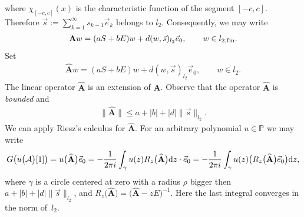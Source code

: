 \documentclass[pdftex]{sigma}
\numberwithin{equation}{section}
\begin{document}
where $\chi_{[-c,c]}(x)$ is the characteristic function of the segment $[-c,c]$. Therefore $\vec s := \sum\limits_{k=1}^\infty s_{k-1} \vec e_k$ belongs to $l_2$. Consequently, we may write
\begin{gather*} \mathbf{A} w = (a S + b E) w + d (w,\vec s)_{l_2} \vec e_0,\qquad w\in l_{2,{\rm f\/in}}. \end{gather*}
Set
\begin{gather*} \widehat{\mathbf{A}} w = (a S + b E) w + d (w,\vec s)_{l_2} \vec e_0,\qquad w\in l_2. \end{gather*}
The linear operator $\widehat{\mathbf{A}}$ is an extension of $\mathbf{A}$. Observe that the operator $\widehat{\mathbf{A}}$ is \textit{bounded} and
\begin{gather*} \big\| \widehat{\mathbf{A}} \big\| \leq a + |b| + |d| \| \vec s \|_{l_2}. \end{gather*}
We can apply Riesz's calculus for $\widehat{\mathbf{A}}$. For an arbitrary polynomial $u\in\mathbb{P}$ we may write
\begin{gather} G \big(u\big(\mathcal{A}\big) [1]\big) = u\big(\widehat{\mathbf{A}}\big) \vec e_0
= -\frac{1}{2\pi i} \int_\gamma u(z) R_z\big(\widehat{\mathbf{A}}\big) {\rm d}z \cdot \vec e_0 =
-\frac{1}{2\pi i} \int_\gamma u(z) \big( R_z\big(\widehat{\mathbf{A}}\big) \vec e_0 \big) {\rm d}z,\label{ff3_53}
\end{gather}
where $\gamma$ is a circle centered at zero with a radius $\rho$ bigger then $a + |b| + |d| \| \vec s \|_{l_2}$, and $R_z\big(\widehat{\mathbf{A}}\big) = \big(\widehat{\mathbf{A}} - zE\big)^{-1}$. Here the last integral converges in the norm of~$l_2$.
\end{document}

